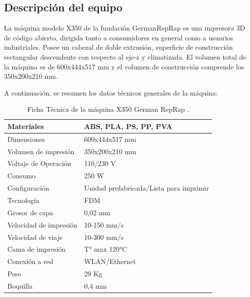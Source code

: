 \subsection{Descripción del equipo}

La máquina modelo X350 de la fundación GermanRepRap es una impresora 3D de código abierto, dirigida tanto a consumidores en general como a usuarios industriales. Posee un cabezal de doble extrusión, superficie de construcción rectangular descendente con respecto al eje-z y  climatizada. El volumen total de la máquina es de 600x444x517 mm y el volumen de construcción comprende los 350x200x210 mm.

A continuación, se resumen los datos técnicos generales de la máquina: 

\begin{table}[H]
  \centering
  
    \begin{tabular}{|l|l|}
    \hline
    Materiales & ABS, PLA, PS, PP, PVA \\
    \hline
    Dimensiones & 600x444x517 mm \\
    \hline
    Volumen de impresión & 350x200x210 mm \\
    \hline
    Voltaje de Operación & 110/230 V \\
    \hline
    Consumo & 250 W \\
    \hline
    Configuración  & Unidad prefabricada/Lista para imprimir \\
    \hline
    Tecnología & FDM \\
    \hline
    Grosor de capa & 0,02 mm \\
    \hline
    Velocidad de impresión  & 10-150 mm/s \\
    \hline
    Velocidad de viaje & 10-300 mm/s \\
    \hline
    Cama de impresión & T° max 120°C \\
    \hline
    Conexión a red & WLAN/Ethernet \\
    \hline
    Peso  & 29 Kg \\
    \hline
    Boquilla & 0,4 mm \\
    \hline
    \end{tabular}%
    \caption{Ficha Técnica de la máquina X350 German RepRap \citep{germanreprap2019}.}
  \label{tab:addlabel}%
\end{table}%

